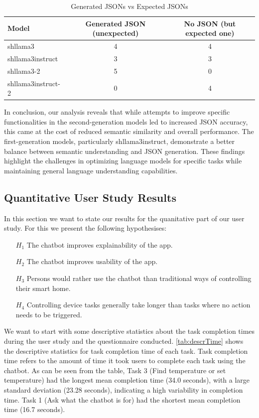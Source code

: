 \begin{table}[h!]
    \centering
    \begin{tabular}{lcc}
        \toprule
        Model & Generated JSON (unexpected) & No JSON (but expected one) \\
        \midrule
        shllama3       & 4 & 4 \\
        shllama3instruct  & 3 & 3 \\
        shllama3-2     & 5 & 0 \\
        shllama3instruct-2& 0 & 4 \\
        \bottomrule
    \end{tabular}
    \caption{Generated JSONs vs Expected JSONs}
    \label{tab:json_summary}
\end{table}

In conclusion, our analysis reveals that while attempts to improve specific functionalities in the second-generation models led to increased JSON accuracy, this came at the cost of reduced semantic similarity and overall performance. The first-generation models, particularly shllama3instruct, demonstrate a better balance between semantic understanding and JSON generation. These findings highlight the challenges in optimizing language models for specific tasks while maintaining general language understanding capabilities.


\subsection{Quantitative User Study Results}
In this section we want to state our results for the quanitative part of our user study. For this we present the following hypothesises:
\begin{itemize}
    \item[\(H_1\)] The chatbot improves explainability of the app.
    \item[\(H_2\)] The chatbot improves usability of the app.
    \item[\(H_3\)] Persons would rather use the chatbot than traditional ways of controlling their smart home.
    \item[\(H_4\)] Controlling device tasks generally take longer than tasks where no action needs to be triggered.
\end{itemize}

We want to start with some descriptive statistics about the task completion times during the user study and the questionnaire conducted.
\cref{tab:descrTime} shows the descriptive statistics for task completion time of each task. Task completion time refers to the amount of time it took users to complete each task using the chatbot. As can be seen from the table, Task 3 (Find temperature or set temperature) had the longest mean completion time (34.0 seconds), with a large standard deviation (23.28 seconds),  indicating a high variability in completion time. Task 1 (Ask what the chatbot is for) had the shortest mean completion time (16.7 seconds).

